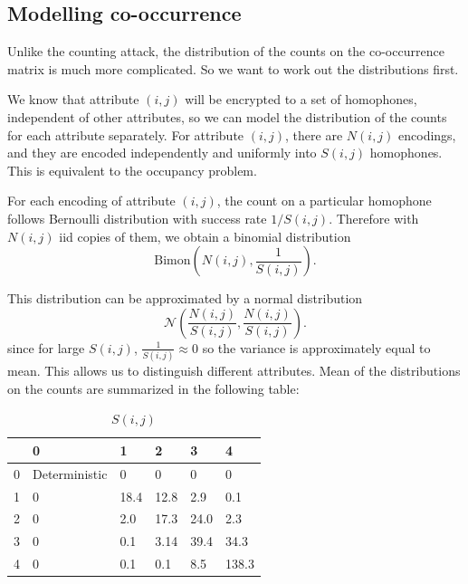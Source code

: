 \documentclass{article}
\begin{document}
\subsection{Modelling co-occurrence}
Unlike the counting attack, the distribution of the counts on the co-occurrence matrix is much more complicated. So we want to work out the distributions first.

We know that attribute $(i, j)$ will be encrypted to a set of homophones, independent of other attributes, so we can model the distribution of the counts for each attribute separately. For attribute $(i,j)$, there are $N(i,j)$ encodings, and they are encoded independently and uniformly into $S(i,j)$ homophones. This is equivalent to the occupancy problem.

For each encoding of attribute $(i,j)$, the count on a particular homophone follows Bernoulli distribution with success rate $1 / S(i,j)$. Therefore with $N(i,j)$ iid copies of them, we obtain a binomial distribution 
\begin{equation*}
	\text{Bimon}\left(N(i,j), \frac{1}{S(i,j)}\right).
\end{equation*}

This distribution can be approximated by a normal distribution
\begin{equation*}
	\mathcal{N}\left(\frac{N(i,j)}{S(i,j)}, \frac{N(i,j)}{S(i,j)}\right).
\end{equation*}
since for large $S(i,j)$, $\frac{1}{S(i,j)} \approx 0$ so the variance is approximately equal to mean. This allows us to distinguish different attributes. Mean of the distributions on the counts are summarized in the following table:

\begin{table}[H] \label{t3}
	\centering
	\begin{tabular}{|l|l|l|l|l|l|}
		\hline
		& 0    & 1     & 2     & 3    & 4    \\ \hline
		0 & Deterministic      & 0    & 0    & 0   & 0   \\ \hline
		1 & 0  & 18.4 & 12.8   & 2.9  & 0.1 \\ \hline
		2 & 0  & 2.0  & 17.3   & 24.0 & 2.3  \\ \hline
		3 & 0  & 0.1  & 3.14   & 39.4 & 34.3  \\ \hline
		4 & 0  & 0.1  & 0.1    & 8.5  & 138.3  \\ \hline
	\end{tabular}
	\caption{$S(i,j)$}
\end{table}
\end{document}
